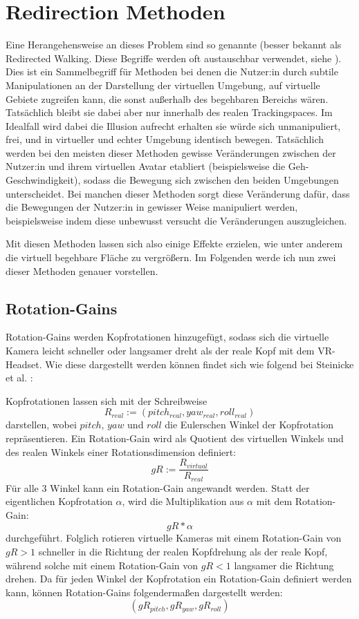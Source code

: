 \section{Redirection Methoden}
Eine Herangehensweise an dieses Problem sind so genannte  (besser bekannt als Redirected Walking. Diese Begriffe werden oft austauschbar verwendet, siehe \cite{redwalk_uebersicht}). Dies ist ein Sammelbegriff für Methoden bei denen die Nutzer:in durch subtile Manipulationen an der Darstellung der virtuellen Umgebung, auf virtuelle Gebiete zugreifen kann, die sonst außerhalb des begehbaren Bereichs wären. Tatsächlich bleibt sie dabei aber nur innerhalb des realen Trackingspaces.
Im Idealfall wird dabei die Illusion aufrecht erhalten sie würde sich unmanipuliert, frei, und in virtueller und echter Umgebung identisch bewegen. Tatsächlich werden bei den meisten dieser Methoden %
gewisse Veränderungen zwischen der Nutzer:in und ihrem virtuellen Avatar etabliert (beispielsweise die Geh-Geschwindigkeit), sodass die Bewegung sich zwischen den beiden Umgebungen unterscheidet.
Bei manchen dieser Methoden sorgt diese Veränderung dafür, dass die Bewegungen der Nutzer:in in gewisser Weise manipuliert werden, beispielsweise indem diese unbewusst versucht die Veränderungen auszugleichen.

Mit diesen Methoden lassen sich also einige Effekte erzielen, wie unter anderem die virtuell begehbare Fläche zu vergrößern.
Im Folgenden werde ich nun zwei dieser Methoden genauer vorstellen.

\subsection{Rotation-Gains}
Rotation-Gains werden Kopfrotationen hinzugefügt, sodass sich die virtuelle Kamera leicht schneller oder langsamer dreht als der reale
Kopf mit dem VR-Headset.
Wie diese dargestellt werden können findet sich wie folgend bei Steinicke et al. \cite{detection-thresholds}:

Kopfrotationen lassen sich mit der Schreibweise
$$ R_{real} := (pitch_{real}, yaw_{real}, roll_{real}) $$
darstellen, wobei $pitch$, $yaw$ und $roll$ die Eulerschen Winkel der Kopfrotation repräsentieren. Ein Rotation-Gain wird als Quotient des virtuellen Winkels und des realen Winkels einer Rotationsdimension definiert:
$$ gR := \frac{R_{virtual}}{R_{real}} $$
Für alle 3 Winkel kann ein Rotation-Gain angewandt werden.
Statt der eigentlichen Kopfrotation $\alpha$, wird die Multiplikation aus $\alpha$ mit dem Rotation-Gain:
$$ gR * \alpha $$
durchgeführt.
Folglich rotieren virtuelle Kameras mit einem Rotation-Gain von $gR > 1$ schneller in die Richtung der realen Kopfdrehung als der reale Kopf, während solche mit einem Rotation-Gain von $gR < 1$ langsamer die Richtung drehen.
Da für jeden Winkel der Kopfrotation ein Rotation-Gain definiert werden kann, können Rotation-Gains folgendermaßen dargestellt werden:
$$(gR_{pitch}, gR_{yaw}, gR_{roll})$$

